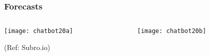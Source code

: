 





\begin{frame}[fragile]\frametitle{Forecasts}

    \begin{columns}
    \begin{column}[t]{0.5\linewidth}
\begin{center}
\texttt{[image: chatbot20a]}

\end{center}

\tiny{(Ref: Subro.io)}

    \end{column}
    \begin{column}[t]{0.5\linewidth}
\begin{center}
\texttt{[image: chatbot20b]}

\end{center}
    \end{column}
  \end{columns}
  

  
\end{frame}

